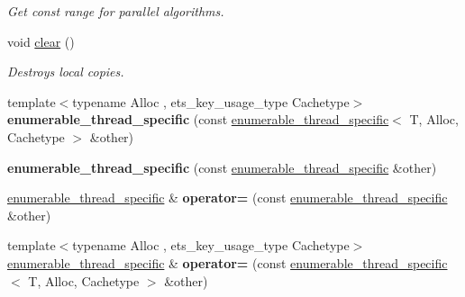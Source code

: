 \begin{DoxyCompactItemize}
\begin{DoxyCompactList}\small\item\em Get const range for parallel algorithms. \end{DoxyCompactList}\item 
\hypertarget{classtbb_1_1interface6_1_1enumerable__thread__specific_a85a0d8f088ef1ee07aeb2c0e944a4a5e}{}void \hyperlink{classtbb_1_1interface6_1_1enumerable__thread__specific_a85a0d8f088ef1ee07aeb2c0e944a4a5e}{clear} ()\label{classtbb_1_1interface6_1_1enumerable__thread__specific_a85a0d8f088ef1ee07aeb2c0e944a4a5e}

\begin{DoxyCompactList}\small\item\em Destroys local copies. \end{DoxyCompactList}\item 
\hypertarget{classtbb_1_1interface6_1_1enumerable__thread__specific_a15960d5f730ea183a581730e912700c8}{}{\footnotesize template$<$typename Alloc , ets\+\_\+key\+\_\+usage\+\_\+type Cachetype$>$ }\\{\bfseries enumerable\+\_\+thread\+\_\+specific} (const \hyperlink{classtbb_1_1interface6_1_1enumerable__thread__specific}{enumerable\+\_\+thread\+\_\+specific}$<$ T, Alloc, Cachetype $>$ \&other)\label{classtbb_1_1interface6_1_1enumerable__thread__specific_a15960d5f730ea183a581730e912700c8}

\item 
\hypertarget{classtbb_1_1interface6_1_1enumerable__thread__specific_a6b614f913497b8dc168a8e6ea03eac48}{}{\bfseries enumerable\+\_\+thread\+\_\+specific} (const \hyperlink{classtbb_1_1interface6_1_1enumerable__thread__specific}{enumerable\+\_\+thread\+\_\+specific} \&other)\label{classtbb_1_1interface6_1_1enumerable__thread__specific_a6b614f913497b8dc168a8e6ea03eac48}

\item 
\hypertarget{classtbb_1_1interface6_1_1enumerable__thread__specific_a7af8784cd0d0f04b3f9f50988b8f0885}{}\hyperlink{classtbb_1_1interface6_1_1enumerable__thread__specific}{enumerable\+\_\+thread\+\_\+specific} \& {\bfseries operator=} (const \hyperlink{classtbb_1_1interface6_1_1enumerable__thread__specific}{enumerable\+\_\+thread\+\_\+specific} \&other)\label{classtbb_1_1interface6_1_1enumerable__thread__specific_a7af8784cd0d0f04b3f9f50988b8f0885}

\item 
\hypertarget{classtbb_1_1interface6_1_1enumerable__thread__specific_a5e2cfddffa47dd0eb042cf6cbcea815f}{}{\footnotesize template$<$typename Alloc , ets\+\_\+key\+\_\+usage\+\_\+type Cachetype$>$ }\\\hyperlink{classtbb_1_1interface6_1_1enumerable__thread__specific}{enumerable\+\_\+thread\+\_\+specific} \& {\bfseries operator=} (const \hyperlink{classtbb_1_1interface6_1_1enumerable__thread__specific}{enumerable\+\_\+thread\+\_\+specific}$<$ T, Alloc, Cachetype $>$ \&other)\label{classtbb_1_1interface6_1_1enumerable__thread__specific_a5e2cfddffa47dd0eb042cf6cbcea815f}


\end{DoxyCompactItemize}
